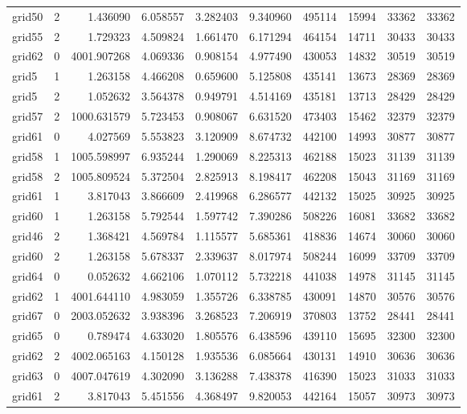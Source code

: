 \begin{longtable}{|l|r|r|r|r|r|r|r|r|r|}
grid50 & 2 & 1.436090 & 6.058557 & 3.282403 & 9.340960 & 495114 & 15994 & 33362 & 33362 \\
grid55 & 2 & 1.729323 & 4.509824 & 1.661470 & 6.171294 & 464154 & 14711 & 30433 & 30433 \\
grid62 & 0 & 4001.907268 & 4.069336 & 0.908154 & 4.977490 & 430053 & 14832 & 30519 & 30519 \\
grid5 & 1 & 1.263158 & 4.466208 & 0.659600 & 5.125808 & 435141 & 13673 & 28369 & 28369 \\
grid5 & 2 & 1.052632 & 3.564378 & 0.949791 & 4.514169 & 435181 & 13713 & 28429 & 28429 \\
grid57 & 2 & 1000.631579 & 5.723453 & 0.908067 & 6.631520 & 473403 & 15462 & 32379 & 32379 \\
grid61 & 0 & 4.027569 & 5.553823 & 3.120909 & 8.674732 & 442100 & 14993 & 30877 & 30877 \\
grid58 & 1 & 1005.598997 & 6.935244 & 1.290069 & 8.225313 & 462188 & 15023 & 31139 & 31139 \\
grid58 & 2 & 1005.809524 & 5.372504 & 2.825913 & 8.198417 & 462208 & 15043 & 31169 & 31169 \\
grid61 & 1 & 3.817043 & 3.866609 & 2.419968 & 6.286577 & 442132 & 15025 & 30925 & 30925 \\
grid60 & 1 & 1.263158 & 5.792544 & 1.597742 & 7.390286 & 508226 & 16081 & 33682 & 33682 \\
grid46 & 2 & 1.368421 & 4.569784 & 1.115577 & 5.685361 & 418836 & 14674 & 30060 & 30060 \\
grid60 & 2 & 1.263158 & 5.678337 & 2.339637 & 8.017974 & 508244 & 16099 & 33709 & 33709 \\
grid64 & 0 & 0.052632 & 4.662106 & 1.070112 & 5.732218 & 441038 & 14978 & 31145 & 31145 \\
grid62 & 1 & 4001.644110 & 4.983059 & 1.355726 & 6.338785 & 430091 & 14870 & 30576 & 30576 \\
grid67 & 0 & 2003.052632 & 3.938396 & 3.268523 & 7.206919 & 370803 & 13752 & 28441 & 28441 \\
grid65 & 0 & 0.789474 & 4.633020 & 1.805576 & 6.438596 & 439110 & 15695 & 32300 & 32300 \\
grid62 & 2 & 4002.065163 & 4.150128 & 1.935536 & 6.085664 & 430131 & 14910 & 30636 & 30636 \\
grid63 & 0 & 4007.047619 & 4.302090 & 3.136288 & 7.438378 & 416390 & 15023 & 31033 & 31033 \\
grid61 & 2 & 3.817043 & 5.451556 & 4.368497 & 9.820053 & 442164 & 15057 & 30973 & 30973 \\

\end{longtable}
